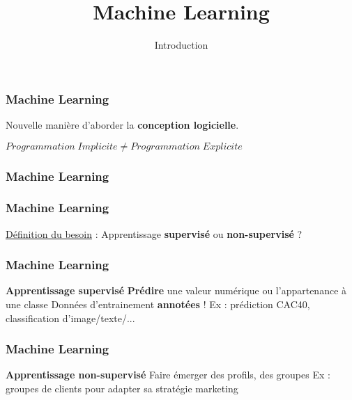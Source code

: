 \documentclass{formation}
\title{Machine Learning}
\subtitle{Introduction}
\begin{document}
\maketitle

\begin{frame}
  \frametitle{Machine Learning}
  \begin{center}
  Nouvelle manière d'aborder la \textbf{conception logicielle}.
  \end{center}
  \begin{center}
  $\boxed{Programmation\;Implicite \neq Programmation\;Explicite}$
  \end{center}
\end{frame}

\begin{frame}
  \frametitle{Machine Learning}
\end{frame}

\begin{frame}
  \frametitle{Machine Learning}
  \underline{Définition du besoin} :
  \newline
  \newline
  Apprentissage \textbf{supervisé} ou \textbf{non-supervisé} ?
\end{frame}

\begin{frame}
  \frametitle{Machine Learning}
  \textbf{Apprentissage supervisé}
  \newline \newline
  \textbf{Prédire} une valeur numérique ou l'appartenance à une classe
  \newline
  Données d'entrainement \textbf{annotées} !
  \newline \newline
  Ex : prédiction CAC40, classification d'image/texte/...
\end{frame}

\begin{frame}
  \frametitle{Machine Learning}
  \textbf{Apprentissage non-supervisé}
  \newline \newline
  Faire émerger des profils, des groupes
  \newline \newline
  Ex : groupes de clients pour adapter sa stratégie marketing
\end{frame}
\end{document}
